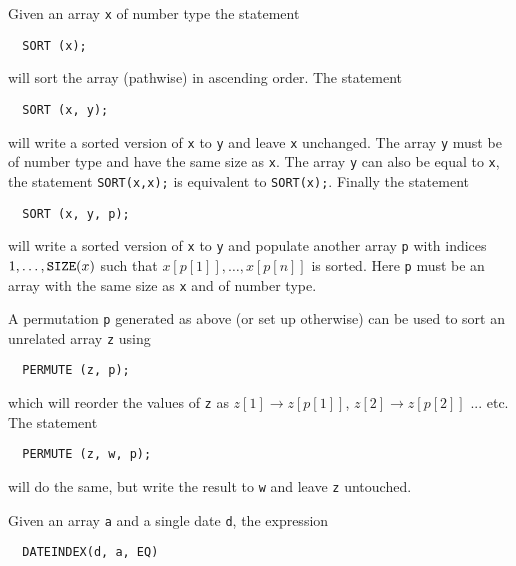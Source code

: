 Given an array \verb+x+ of number type the statement

\begin{verbatim}
  SORT (x);
\end{verbatim}

will sort the array (pathwise) in ascending order. The statement

\begin{verbatim}
  SORT (x, y);
\end{verbatim}

will write a sorted version of \verb+x+ to \verb+y+ and leave \verb+x+ unchanged. The array \verb+y+ must be of number
type and have the same size as \verb+x+. The array \verb+y+ can also be equal to \verb+x+, the statement
\verb+SORT(x,x);+ is equivalent to \verb+SORT(x);+. Finally the statement

\begin{verbatim}
  SORT (x, y, p);
\end{verbatim}

will write a sorted version of \verb+x+ to \verb+y+ and populate another array \verb+p+ with indices $1,\ldots,\verb+SIZE+(x)$
such that $x[p[1]], \ldots, x[p[n]]$ is sorted. Here \verb+p+ must be an array with the same size as \verb+x+ and of
number type.

A permutation \verb+p+ generated as above (or set up otherwise) can be used to sort an unrelated array \verb+z+ using

\begin{verbatim}
  PERMUTE (z, p);
\end{verbatim}

which will reorder the values of \verb+z+ as $z[1] \rightarrow z[p[1]]$, $z[2] \rightarrow z[p[2]]$ ... etc. The statement

\begin{verbatim}
  PERMUTE (z, w, p);
\end{verbatim}

will do the same, but write the result to \verb+w+ and leave \verb+z+ untouched.

\label{function_dateindex}

Given an array \verb+a+ and a single date \verb+d+, the expression

\begin{verbatim}
  DATEINDEX(d, a, EQ)
\end{verbatim}

